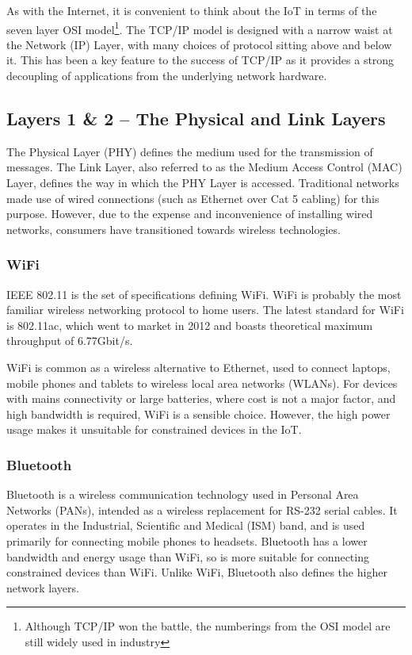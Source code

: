 \documentclass[10pt,journal,compsoc]{IEEEtran}
\begin{document}
As with the Internet, it is convenient to think about the IoT in terms of the
seven layer OSI model\footnote{Although TCP/IP won the battle, the numberings
from the OSI model are still widely used in industry}. The TCP/IP model is
designed with a narrow waist at the Network (IP) Layer, with many choices of
protocol sitting above and below it. This has been a key feature to the success
of TCP/IP as it provides a strong decoupling of applications from the
underlying network hardware.

\subsection{Layers 1 \& 2 -- The Physical and Link Layers}
\label{layer_1_2}
The Physical Layer (PHY) defines the medium used for the transmission of
messages. The Link Layer, also referred to as the Medium Access Control
(MAC) Layer, defines the way in which the PHY Layer is accessed. Traditional
networks made use of wired connections (such as Ethernet over Cat 5 cabling)
for this purpose. However, due to the expense and inconvenience of installing
wired networks, consumers have transitioned towards wireless technologies. 

\subsubsection{WiFi}
IEEE 802.11 is the set of specifications defining WiFi. WiFi is probably the
most familiar wireless networking protocol to home users. The latest standard
for WiFi is 802.11ac, which went to market in 2012 and boasts theoretical
maximum throughput of 6.77Gbit/s. 

WiFi is common as a wireless alternative to Ethernet, used to connect laptops,
mobile phones and tablets to wireless local area networks (WLANs). For devices
with mains connectivity or large batteries, where cost is not a major factor,
and high bandwidth is required, WiFi is a sensible choice. However, the high
power usage makes it unsuitable for constrained devices in the IoT.

\subsubsection{Bluetooth}
Bluetooth is a wireless communication technology used in Personal Area Networks
(PANs), intended as a wireless replacement for RS-232 serial cables. It
operates in the Industrial, Scientific and Medical (ISM) band, and is used
primarily for connecting mobile phones to headsets. Bluetooth has a lower
bandwidth and energy usage than WiFi, so is more suitable for connecting
constrained devices than WiFi. Unlike WiFi, Bluetooth also defines the higher
network layers. 
\end{document}
